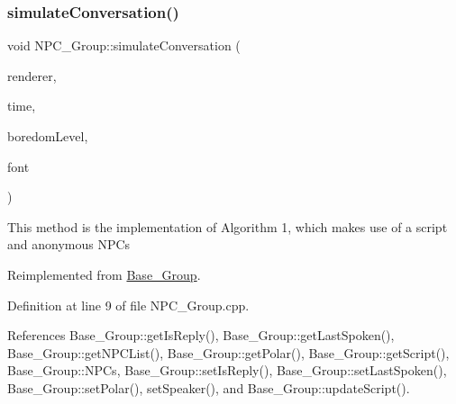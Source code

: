 \subsubsection{\texorpdfstring{simulate\+Conversation()}{simulateConversation()}}
{\footnotesize\ttfamily void N\+P\+C\+\_\+\+Group\+::simulate\+Conversation (\begin{DoxyParamCaption}\item[{S\+D\+L\+\_\+\+Renderer $\ast$}]{renderer,  }\item[{bool}]{time,  }\item[{std\+::string}]{boredom\+Level,  }\item[{T\+T\+F\+\_\+\+Font $\ast$}]{font }\end{DoxyParamCaption})\hspace{0.3cm}{\ttfamily [virtual]}}

This method is the implementation of Algorithm 1, which makes use of a script and anonymous N\+P\+Cs 

Reimplemented from \hyperlink{class_base___group_aa5080b6388c5974394bf326ce80bfa91}{Base\+\_\+\+Group}.



Definition at line 9 of file N\+P\+C\+\_\+\+Group.\+cpp.



References Base\+\_\+\+Group\+::get\+Is\+Reply(), Base\+\_\+\+Group\+::get\+Last\+Spoken(), Base\+\_\+\+Group\+::get\+N\+P\+C\+List(), Base\+\_\+\+Group\+::get\+Polar(), Base\+\_\+\+Group\+::get\+Script(), Base\+\_\+\+Group\+::\+N\+P\+Cs, Base\+\_\+\+Group\+::set\+Is\+Reply(), Base\+\_\+\+Group\+::set\+Last\+Spoken(), Base\+\_\+\+Group\+::set\+Polar(), set\+Speaker(), and Base\+\_\+\+Group\+::update\+Script().


